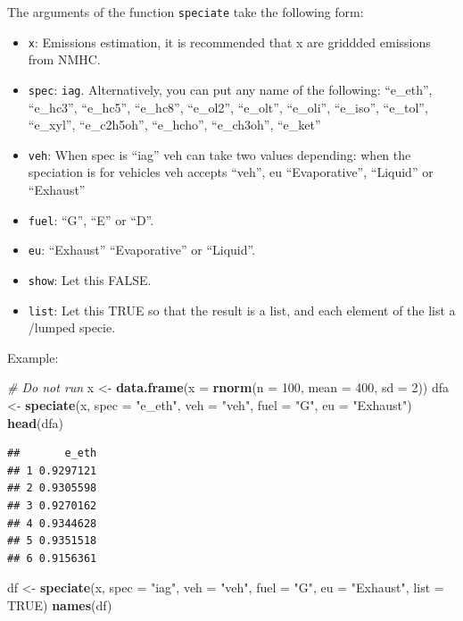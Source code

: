 \documentclass[12pt,graybox,envcountchap,sectrefs]{krantz}
\makeatletter
\newenvironment{Shaded}{\begin{snugshade}}{\end{snugshade}}
\newcommand{\KeywordTok}[1]{\textcolor[rgb]{0.13,0.29,0.53}{\textbf{#1}}}
\newcommand{\DataTypeTok}[1]{\textcolor[rgb]{0.13,0.29,0.53}{#1}}
\newcommand{\DecValTok}[1]{\textcolor[rgb]{0.00,0.00,0.81}{#1}}
\newcommand{\StringTok}[1]{\textcolor[rgb]{0.31,0.60,0.02}{#1}}
\newcommand{\CommentTok}[1]{\textcolor[rgb]{0.56,0.35,0.01}{\textit{#1}}}
\newcommand{\OtherTok}[1]{\textcolor[rgb]{0.56,0.35,0.01}{#1}}
\newcommand{\NormalTok}[1]{#1}
\providecommand{\tightlist}{%
  \setlength{\itemsep}{0pt}\setlength{\parskip}{0pt}}
\newenvironment{kframe}{%
\medskip{}
\setlength{\fboxsep}{.8em}
 \def\at@end@of@kframe{}%
 \ifinner\ifhmode%
  \def\at@end@of@kframe{\end{minipage}}%
  \begin{minipage}{\columnwidth}%
 \fi\fi%
 \def\FrameCommand##1{\hskip\@totalleftmargin \hskip-\fboxsep
 \colorbox{shadecolor}{##1}\hskip-\fboxsep
     \hskip-\linewidth \hskip-\@totalleftmargin \hskip\columnwidth}%
 \MakeFramed {\advance\hsize-\width
   \@totalleftmargin\z@ \linewidth\hsize
   \@setminipage}}%
 {\par\unskip\endMakeFramed%
 \at@end@of@kframe}
\renewenvironment{Shaded}{\begin{kframe}}{\end{kframe}}
\theoremstyle{definition}
\theoremstyle{definition}
\theoremstyle{definition}
\theoremstyle{remark}
\makeatother
\begin{document}
The arguments of the function \texttt{speciate} take the following form:

\begin{itemize}
\tightlist
\item
  \texttt{x}: Emissions estimation, it is recommended that x are
  griddded emissions from NMHC.
\item
  \texttt{spec}: \texttt{iag}. Alternatively, you can put any name of
  the following: ``e\_eth'', ``e\_hc3'', ``e\_hc5'', ``e\_hc8'',
  ``e\_ol2'', ``e\_olt'', ``e\_oli'', ``e\_iso'', ``e\_tol'',
  ``e\_xyl'', ``e\_c2h5oh'', ``e\_hcho'', ``e\_ch3oh'', ``e\_ket''
\item
  \texttt{veh}: When spec is ``iag'' veh can take two values depending:
  when the speciation is for vehicles veh accepts ``veh'', eu
  ``Evaporative'', ``Liquid'' or ``Exhaust''
\item
  \texttt{fuel}: ``G'', ``E'' or ``D''.
\item
  \texttt{eu}: ``Exhaust'' ``Evaporative'' or ``Liquid''.
\item
  \texttt{show}: Let this FALSE.
\item
  \texttt{list}: Let this TRUE so that the result is a list, and each
  element of the list a /lumped specie.
\end{itemize}

Example:

\begin{Shaded}
\begin{Highlighting}[]
\CommentTok{# Do not run}
\NormalTok{x <-}\StringTok{ }\KeywordTok{data.frame}\NormalTok{(}\DataTypeTok{x =} \KeywordTok{rnorm}\NormalTok{(}\DataTypeTok{n =} \DecValTok{100}\NormalTok{, }\DataTypeTok{mean =} \DecValTok{400}\NormalTok{, }\DataTypeTok{sd =} \DecValTok{2}\NormalTok{))}
\NormalTok{dfa <-}\StringTok{ }\KeywordTok{speciate}\NormalTok{(x, }\DataTypeTok{spec =} \StringTok{"e_eth"}\NormalTok{, }\DataTypeTok{veh =} \StringTok{"veh"}\NormalTok{, }\DataTypeTok{fuel =} \StringTok{"G"}\NormalTok{, }\DataTypeTok{eu =} \StringTok{"Exhaust"}\NormalTok{)}
\KeywordTok{head}\NormalTok{(dfa)}
\end{Highlighting}
\end{Shaded}

\begin{verbatim}
##       e_eth
## 1 0.9297121
## 2 0.9305598
## 3 0.9270162
## 4 0.9344628
## 5 0.9351518
## 6 0.9156361
\end{verbatim}

\begin{Shaded}
\begin{Highlighting}[]
\NormalTok{df <-}\StringTok{ }\KeywordTok{speciate}\NormalTok{(x, }\DataTypeTok{spec =} \StringTok{"iag"}\NormalTok{, }\DataTypeTok{veh =} \StringTok{"veh"}\NormalTok{, }\DataTypeTok{fuel =} \StringTok{"G"}\NormalTok{,}
               \DataTypeTok{eu =} \StringTok{"Exhaust"}\NormalTok{, }\DataTypeTok{list =} \OtherTok{TRUE}\NormalTok{)}
\KeywordTok{names}\NormalTok{(df)}
\end{Highlighting}
\end{Shaded}
\end{document}
